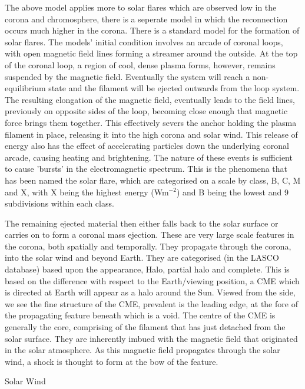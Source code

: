 The above model applies more to solar flares which are observed low in the corona and chromosphere, there is a seperate model in which the reconnection occurs much higher in the corona.
There is a standard model for the formation of solar flares.
The models' initial condition involves an arcade of coronal loops, with open magnetic field lines forming a streamer around the outside.
At the top of the coronal loop, a region of cool, dense plasma forms, however, remains suspended by the magnetic field.
Eventually the system will reach a non-equilibrium state and the filament will be ejected outwards from the loop system.
The resulting elongation of the magnetic field, eventually leads to the field lines, previously on opposite sides of the loop, becoming close enough that magnetic force brings them together.
This effectively severs the anchor holding the plasma filament in place, releasing it into the high corona and solar wind. 
This release of energy also has the effect of accelerating particles down the underlying coronal arcade, causing heating and brightening.
The nature of these events is sufficient to cause 'bursts' in the electromagnetic spectrum.
This is the phenomena that has been named the solar flare, which are categorised on a scale by class, B, C, M and X, with X being the highest energy (Wm$^{-2}$) and B being the lowest and 9 subdivisions within each class. 

The remaining ejected material then either falls back to the solar surface or carries on to form a coronal mass ejection.
These are very large scale features in the corona, both spatially and temporally.
They propagate through the corona, into the solar wind and beyond Earth.
They are categorised (in the LASCO database) based upon the appearance, Halo, partial halo and complete.
This is based on the difference with respect to the Earth/viewing position, a CME which is directed at Earth will appear as a halo around the Sun.
Viewed from the side, we see the fine structure of the CME, prevalent is the leading edge, at the fore of the propagating feature beneath which is a void.
The centre of the CME is generally the core, comprising of the filament that has just detached from the solar surface.
They are inherently imbued with the magnetic field that originated in the solar atmosphere.
As this magnetic field propagates through the solar wind, a shock is thought to form at the bow of the feature.





Solar Wind

